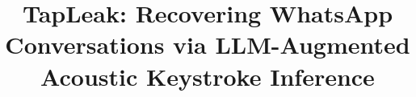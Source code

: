 \documentclass[conference]{IEEEtran}
\begin{document}
\title{TapLeak: Recovering WhatsApp Conversations via LLM-Augmented Acoustic Keystroke Inference}


\maketitle
\end{document}
